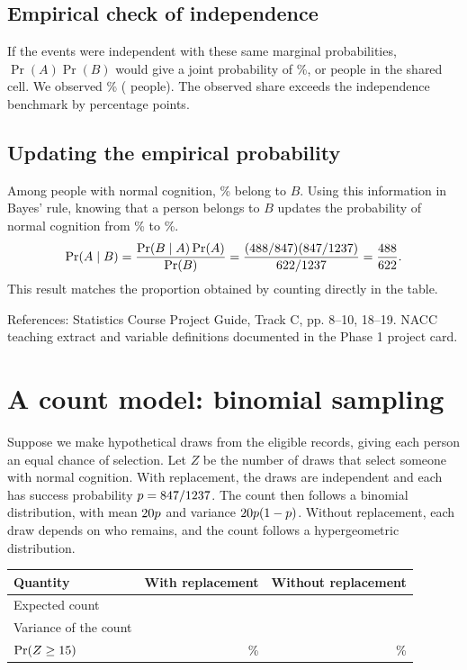 \documentclass[11pt]{article}
\begin{document}
\subsection*{Empirical check of independence}
If the events were independent with these same marginal probabilities,
$\Pr(A)\Pr(B)$ would give a joint probability of \ExpectedJoint{}\%,
or \ExpectedCount{} people in the shared cell. We observed
\JointAB{}\% (\CellAB{} people). The observed share exceeds the
independence benchmark by \JointGap{} percentage points.

\subsection*{Updating the empirical probability}
Among people with normal cognition, \BayesLikelihood{}\% belong to $B$.
Using this information in Bayes' rule, knowing that a person belongs to
$B$ updates the probability of normal cognition from \MargA{}\% to
\BayesPosterior{}\%.
\[
\Pr(A\mid B)=\frac{\Pr(B\mid A)\Pr(A)}{\Pr(B)}
 =\frac{(488/847)(847/1237)}{622/1237}
 =\frac{488}{622}.
\]
This result matches the proportion obtained by counting directly in the table.

{\small References: Statistics Course Project Guide, Track C, pp. 8--10,
18--19. NACC teaching extract and variable definitions documented in the
Phase 1 project card.\par}

\clearpage
\section{A count model: binomial sampling}
Suppose we make \DrawN{} hypothetical draws from the \EventN{} eligible
records, giving each person an equal chance of selection. Let $Z$ be the
number of draws that select someone with normal cognition. With
replacement, the draws are independent and each has success probability
$p=847/1237$. The count then follows a binomial distribution,
with mean $20 p$ and variance $20 p(1-p)$. Without replacement,
each draw depends on who remains, and the count follows a hypergeometric
distribution.

\begin{center}\small
\begin{tabular}{@{}lrr@{}}
\toprule
Quantity & With replacement & Without replacement \\
\midrule
Expected count & \CountMean{} & \CountMean{} \\
Variance of the count & \BinomialVar{} & \HypergeomVar{} \\
$\Pr(Z\geq 15)$ & \BinomialTail{}\% & \HypergeomTail{}\% \\
\bottomrule
\end{tabular}
\end{center}
\end{document}
